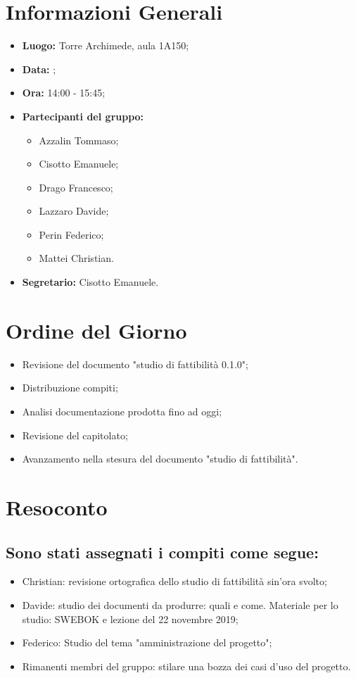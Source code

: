 \section{Informazioni Generali}
\begin{itemize}
\item \textbf{Luogo:} Torre Archimede, aula 1A150;
\item \textbf{Data:} \Data;
\item \textbf{Ora:} 14:00 - 15:45;
\item \textbf{Partecipanti del gruppo:}
	\begin{itemize}
	\item Azzalin Tommaso; 
	\item Cisotto Emanuele; 
	\item Drago Francesco;
	\item Lazzaro Davide;
	\item Perin Federico;
	\item Mattei Christian.
	\end{itemize} 
\item \textbf{Segretario:} Cisotto Emanuele.
\end{itemize}

\section{Ordine del Giorno}
\begin{itemize}
\item Revisione del documento "studio di fattibilità 0.1.0";
\item Distribuzione compiti;
\item Analisi documentazione prodotta fino ad oggi;
\item Revisione del capitolato;
\item Avanzamento nella stesura del documento "studio di fattibilità".
\end{itemize}

\section{Resoconto}

\subsection{Sono stati assegnati i compiti come segue:}
\begin{itemize}
\item Christian: revisione ortografica dello studio di fattibilità sin'ora svolto;
\item Davide: studio dei documenti da produrre: quali e come. Materiale per lo studio: SWEBOK e lezione del 22 novembre 2019;
\item Federico: Studio del tema "amministrazione del progetto";
\item Rimanenti membri del gruppo: stilare una bozza dei casi d'uso del progetto.
\end{itemize} 
\clearpage